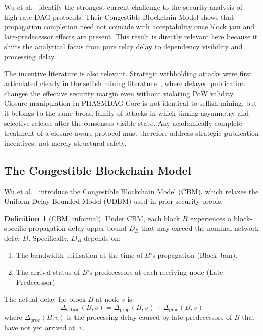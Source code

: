 \documentclass[11pt]{article}
\theoremstyle{definition}
\newtheorem{definition}{Definition}[section]
\theoremstyle{plain}
\theoremstyle{remark}
\begin{document}
Wu et al.~\cite{wu2024security} identify the strongest current challenge to the
security analysis of high-rate DAG protocols.
Their Congestible Blockchain Model shows that propagation completion need not
coincide with acceptability once block jam and late-predecessor effects are
present.
This result is directly relevant here because it shifts the analytical focus
from pure relay delay to dependency visibility and processing delay.

The incentive literature is also relevant.
Strategic withholding attacks were first articulated clearly in the selfish
mining literature~\cite{eyal2013majority}, where delayed publication changes
the effective security margin even without violating PoW validity.
Closure manipulation in PHASMDAG-Core is not identical to selfish mining, but it
belongs to the same broad family of attacks in which timing asymmetry and
selective release alter the consensus-visible state.
Any academically complete treatment of a closure-aware protocol must therefore
address strategic publication incentives, not merely structural safety.

\subsection{The Congestible Blockchain Model}

Wu et al.~\cite{wu2024security} introduce the Congestible Blockchain Model
(CBM), which relaxes the Uniform Delay Bounded Model (UDBM) used in prior
security proofs.

\begin{definition}[CBM, informal]\label{def:cbm}
Under CBM, each block $B$ experiences a block-specific propagation delay upper
bound $D_B$ that may exceed the nominal network delay $D$.  Specifically,
$D_B$ depends on:
\begin{enumerate}[nosep]
    \item The bandwidth utilisation at the time of $B$'s propagation
    (Block Jam).
    \item The arrival status of $B$'s predecessors at each receiving node
    (Late Predecessor).
\end{enumerate}
The actual delay for block $B$ at node $v$ is:
\begin{equation}\label{eq:actual_delay}
\Delta_{\mathrm{actual}}(B, v)
= \Delta_{\mathrm{prop}}(B, v) + \Delta_{\mathrm{proc}}(B, v)
\end{equation}
where $\Delta_{\mathrm{proc}}(B, v)$ is the processing delay caused by late
predecessors of $B$ that have not yet arrived at~$v$.
\end{definition}
\end{document}

